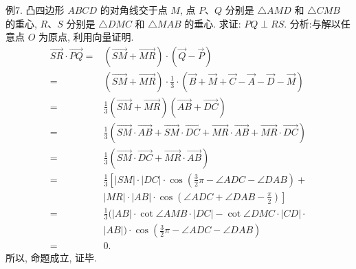 例7. 凸四边形 $A B C D$ 的对角线交于点 $M$, 点 $P 、 Q$ 分别是 $\triangle A M D$ 和 $\triangle C M B$ 的重心, $R 、 S$ 分别是 $\triangle D M C$ 和 $\triangle M A B$ 的垂心.
求证: $P Q \perp R S$.
分析:与解以任意点 $O$ 为原点, 利用向量证明.
$$
\begin{aligned}
\overrightarrow{S R} \cdot \overrightarrow{P Q}= & (\overrightarrow{S M}+\overrightarrow{M R}) \cdot(\vec{Q}-\vec{P}) \\
= & (\overrightarrow{S M}+\overrightarrow{M R}) \cdot \frac{1}{3} \cdot(\vec{B}+\vec{M}+\vec{C}-\vec{A}-\vec{D}-\vec{M}) \\
= & \frac{1}{3}(\overrightarrow{S M}+\overrightarrow{M R})(\overrightarrow{A B}+\overrightarrow{D C}) \\
= & \frac{1}{3}(\overrightarrow{S M} \cdot \overrightarrow{A B}+\overrightarrow{S M} \cdot \overrightarrow{D C}+\overrightarrow{M R} \cdot \overrightarrow{A B}+\overrightarrow{M R} \cdot \overrightarrow{D C}) \\
= & \frac{1}{3}(\overrightarrow{S M} \cdot \overrightarrow{D C}+\overrightarrow{M R} \cdot \overrightarrow{A B}) \\
= & \frac{1}{3}\left[|S M| \cdot|D C| \cdot \cos \left(\frac{3}{2} \pi-\angle A D C-\angle D A B\right)+\right. \\
& \left.|M R| \cdot|A B| \cdot \cos \left(\angle A D C+\angle D A B-\frac{\pi}{2}\right)\right] \\
= & \frac{1}{3}(|A B| \cdot \cot \angle A M B \cdot|D C|-\cot \angle D M C \cdot|C D| \cdot \\
& |A B|) \cdot \cos \left(\frac{3}{2} \pi-\angle A D C-\angle D A B\right) \\
= & 0 .
\end{aligned}
$$
所以, 命题成立, 证毕.



